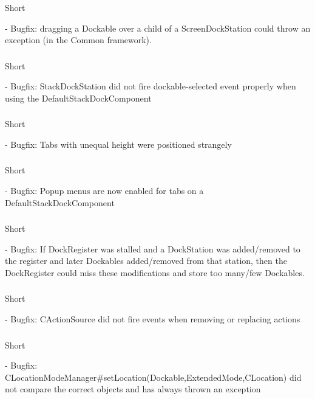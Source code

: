 \documentclass[a4paper,10pt]{article}
\newcommand{\short}{\item[Short]}
\begin{document}
\subsubsection{}
\begin{description}
 \short 
\end{description}
- Bugfix: dragging a Dockable over a child of a ScreenDockStation could throw an exception (in the Common framework).
\subsubsection{}
\begin{description}
 \short 
\end{description}
- Bugfix: StackDockStation did not fire dockable-selected event properly when using the DefaultStackDockComponent
\subsubsection{}
\begin{description}
 \short 
\end{description}
- Bugfix: Tabs with unequal height were positioned strangely
\subsubsection{}
\begin{description}
 \short 
\end{description}
- Bugfix: Popup menus are now enabled for tabs on a DefaultStackDockComponent
\subsubsection{}
\begin{description}
 \short 
\end{description}
- Bugfix: If DockRegister was stalled and a DockStation was added/removed to the register and later Dockables added/removed from that station, then the DockRegister could miss these modifications and store too many/few Dockables.
\subsubsection{}
\begin{description}
 \short 
\end{description}
- Bugfix: CActionSource did not fire events when removing or replacing actions
\subsubsection{}
\begin{description}
 \short 
\end{description}
- Bugfix: CLocationModeManager#setLocation(Dockable,ExtendedMode,CLocation) did not compare the correct objects and has always thrown an exception
\end{document}
